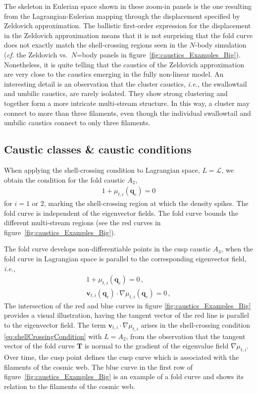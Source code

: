 \documentclass[a4paper, 11pt]{article}
\begin{document}
 The skeleton in Eulerian space shown in these zoom-in panels is the one resulting from the Lagrangian-Eulerian mapping through the displacement specified by Zeldovich approximation. The ballistic first-order expression for the displacement in the Zeldovich approximation means that it is not surprising that the fold curve does not exactly match the shell-crossing regions seen in the $N$-body simulation (\textit{cf.} the Zeldovich vs.\ $N$=body panels in figure~\ref{fig:caustics_Examples_Big}). Nonetheless, it is quite telling that the caustics of the Zeldovich approximation are very close to the caustics emerging in the fully non-linear model. An interesting detail is an observation that the cluster caustics, \textit{i.e.}, the swallowtail and umbilic caustics, are rarely isolated. They show strong clustering and together form a more intricate multi-stream structure. In this way, a cluster may connect to more than three filaments,  even though the individual swallowtail and umbilic caustics connect to only three filaments.

\subsection{Caustic classes \& caustic conditions} 
When applying the shell-crossing condition to Lagrangian space, $L=\mathcal{L}$, we obtain the condition for the fold caustic $A_2$,
\begin{align}
1+\mu_{t,i}(\bm{q}_c)=0
\end{align}
for $i=1$ or $2$, marking the shell-crossing region at which the density spikes. The fold curve is independent of the eigenvector fields. The fold curve bounds the different multi-stream regions (see the red curves in figure~\ref{fig:caustics_Examples_Big}).

\bigskip
The fold curve develops non-differentiable points in the cusp caustic $A_3$, when the fold curve in Lagrangian space is parallel to the corresponding eigenvector field, \textit{i.e.}, 
\begin{align}
1+\mu_{t,i}(\bm{q}_c)=0\,,\\
\bm{v}_{t,i}(\bm{q}_c) \cdot \nabla \mu_{t,i}(\bm{q}_c)=0\,,\label{eq:cuspCondition}
\end{align}
The intersection of the red and blue curves in figure \ref{fig:caustics_Examples_Big} provides a visual illustration, having the tangent vector of the red line is parallel to the eigenvector field. The term $\bm{v}_{t,i} \cdot \nabla \mu_{t,i}$ arises in the shell-crossing condition \eqref{eq:shellCrossingCondition} with $L=A_2$, from the observation that the tangent vector of the fold curve $\bm{T}$ is normal to the gradient of the eigenvalue field $\nabla \mu_{t,i}$. Over time, the cusp point defines the cusp curve which is associated with the filaments of the cosmic web. The blue curve in the first row of figure~\ref{fig:caustics_Examples_Big} is an example of a fold curve and shows its relation to the filaments of the cosmic web. 
\end{document}
